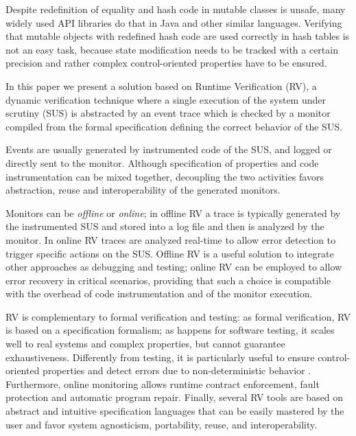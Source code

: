 Despite redefinition of equality and hash code in mutable classes is unsafe, many widely used API libraries do that in Java and other similar languages.
Verifying that mutable objects with redefined hash code are used correctly in hash tables is not an easy task, because state modification needs to be tracked with a certain precision and rather complex control-oriented properties \cite{AhrendtCPS17,AnconaDF18} have to be ensured.

In this paper we present a solution based on Runtime Verification (RV), a dynamic verification technique where
a single execution of the system under scrutiny (SUS) is abstracted by an event trace
which is checked by a monitor compiled from the formal specification defining the correct behavior
of the SUS.

Events are usually generated by instrumented code of the SUS, and logged or directly sent to the monitor.
Although specification of properties and code instrumentation can be mixed together, decoupling the two activities favors abstraction, reuse and
interoperability of the generated monitors.

Monitors can be \emph{offline} or \emph{online};
in offline RV a trace is typically generated by the instrumented SUS and stored into a log file and then is analyzed by the monitor.
In online RV traces are analyzed real-time to allow error detection to trigger specific actions on the SUS. 
Offline RV \cite{Colombo2022} is a useful solution to integrate other approaches as debugging and testing;  %
online RV can be employed to allow error recovery in critical scenarios, providing that such a choice is compatible with the overhead of code instrumentation and of the monitor execution. 

RV is complementary to formal verification and testing:
as formal verification, RV is based on a specification formalism; as happens for software testing, it
scales well to real systems and complex properties, but cannot guarantee exhaustiveness.
Differently from testing, it is particularly useful to ensure control-oriented properties \cite{AhrendtCPS17,AnconaDF18} 
and detect errors due to non-deterministic behavior \cite{havelund2004,sharma2009}.
Furthermore, online monitoring allows runtime contract enforcement, fault protection and automatic program repair.
Finally, several RV tools are based on abstract and intuitive specification languages that can be easily mastered by the user
and favor system agnosticism, portability, reuse, and interoperability.

